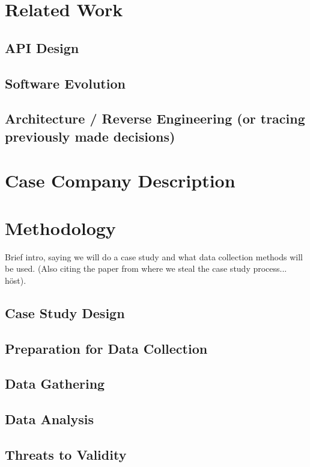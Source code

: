 \documentclass[10pt,twocolumn]{article}
\begin{document}
\section{Related Work}

\subsection{API Design}

\subsection{Software Evolution}

\subsection{Architecture / Reverse Engineering (or tracing previously made decisions)}

\section{Case Company Description}



\section{Methodology}
Brief intro, saying we will do a case study and what data collection methods will be used. (Also citing the paper from where we steal the case study process... höst).

\subsection{Case Study Design}


\subsection{Preparation for Data Collection}

\subsection{Data Gathering}

\subsection{Data Analysis}

\subsection{Threats to Validity}








\noindent
\end{document}
